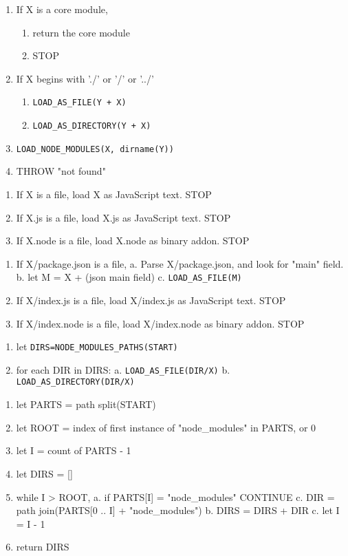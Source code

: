 \begin{enumerate}
\item If X is a core module,
\begin{enumerate}
  \item return the core module
  \item STOP
\end{enumerate}
\item If X begins with './' or '/' or '../'
\begin{enumerate}
  \item \verb|LOAD_AS_FILE(Y + X)|
  \item \verb|LOAD_AS_DIRECTORY(Y + X)|
\end{enumerate}
\item \verb|LOAD_NODE_MODULES(X, dirname(Y))|
\item THROW "not found"
\end{enumerate}

\begin{enumerate}
\item If X is a file, load X as JavaScript text.  STOP
\item If X.js is a file, load X.js as JavaScript text.  STOP
\item If X.node is a file, load X.node as binary addon.  STOP
\end{enumerate}

\begin{enumerate}
\item If X/package.json is a file,
   a. Parse X/package.json, and look for "main" field.
   b. let M = X + (json main field)
   c. \verb|LOAD_AS_FILE(M)|
\item If X/index.js is a file, load X/index.js as JavaScript text.  STOP
\item If X/index.node is a file, load X/index.node as binary addon.  STOP
\end{enumerate}

\begin{enumerate}
\item let \verb|DIRS=NODE_MODULES_PATHS(START)|
\item for each DIR in DIRS:
   a. \verb|LOAD_AS_FILE(DIR/X)|
   b. \verb|LOAD_AS_DIRECTORY(DIR/X)|
\end{enumerate}

\begin{enumerate}
\item let PARTS = path split(START)
\item let ROOT = index of first instance of "node\_modules" in PARTS, or 0
\item let I = count of PARTS - 1
\item let DIRS = []
\item while I > ROOT,
   a. if PARTS[I] = "node\_modules" CONTINUE
   c. DIR = path join(PARTS[0 .. I] + "node\_modules")
   b. DIRS = DIRS + DIR
   c. let I = I - 1
\item return DIRS
\end{enumerate}
